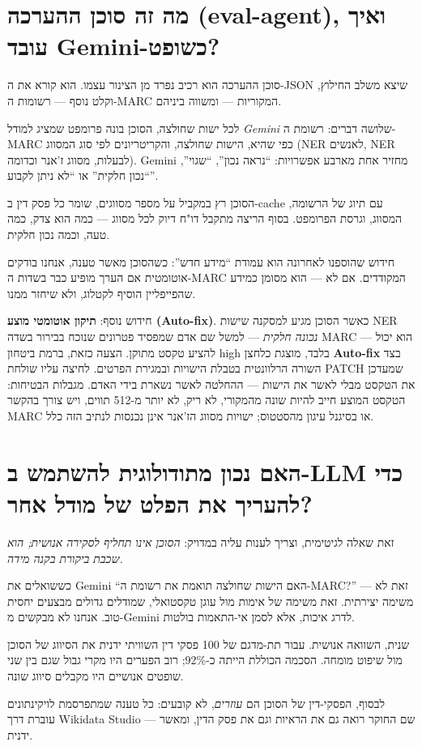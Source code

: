 \documentclass[12pt,a4paper]{article}
\begin{document}
\section{\texthebrew{מה זה סוכן ההערכה (eval-agent), ואיך עובד Gemini-כשופט?}}
\begin{hebrew}
סוכן ההערכה הוא רכיב נפרד מן הצינור עצמו. הוא קורא את ה-JSON שיצא משלב החילוץ, וקלט נוסף --- רשומות ה-MARC המקוריות --- ומשווה ביניהם.
\par
לכל ישות שחולצה, הסוכן בונה פרומפט שמציג למודל \emph{Gemini} שלושה דברים: רשומת ה-MARC כפי שהיא, הישות שחולצה, והקריטריונים לפי סוג המסווג (NER לאנשים, NER לבעלות, מסווג ז'אנר וכדומה). Gemini מחזיר אחת מארבע אפשרויות: ``נראה נכון'', ``שגוי'', ``נכון חלקית'' או ``לא ניתן לקבוע''.
\par
הסוכן רץ במקביל על מספר מסווגים, שומר כל פסק דין ב-cache עם תיוג של הרשומה, המסווג, וגרסת הפרומפט. בסוף הריצה מתקבל דו"ח דיוק לכל מסווג --- כמה הוא צדק, כמה טעה, וכמה נכון חלקית.
\par
חידוש שהוספנו לאחרונה הוא עמודת ``מידע חדש'': כשהסוכן מאשר טענה, אנחנו בודקים אוטומטית אם הערך מופיע כבר בשדות ה-MARC המקודדים. אם לא --- הוא מסומן כמידע שהפייפליין הוסיף לקטלוג, ולא שיחזר ממנו.
\par
חידוש נוסף: \textbf{תיקון אוטומטי מוצע (Auto-fix)}. כאשר הסוכן מגיע למסקנה שישות NER \emph{נכונה חלקית} --- למשל שם אדם שמפסיד פטרונים שנוכח בבירור בשדה MARC --- הוא יכול להציע טקסט מתוקן. הצעה כזאת, ברמת ביטחון \textenglish{high} בלבד, מוצגת כלחצן \textbf{Auto-fix} בצד השורה הרלוונטית בטבלת הישויות ובמגירת הפרטים. לחיצה עליו שולחת PATCH שמעדכן את הטקסט מבלי לאשר את הישות --- ההחלטה לאשר נשארת בידי האדם. מגבלות הבטיחות: הטקסט המוצע חייב להיות שונה מהמקורי, לא ריק, לא יותר מ-512 תווים, ויש צורך בהקשר MARC או בסיגנל עיגון מהסטטוס; ישויות מסווג הז'אנר אינן נכנסות לנתיב הזה כלל.
\end{hebrew}


\section{\texthebrew{האם נכון מתודולוגית להשתמש ב-LLM כדי להעריך את הפלט של מודל אחר?}}
\begin{hebrew}
זאת שאלה לגיטימית, וצריך לענות עליה במדויק: \emph{הסוכן אינו תחליף לסקירה אנושית; הוא שכבת ביקורת בקנה מידה.}
\par
כששואלים את Gemini ``האם הישות שחולצה תואמת את רשומת ה-MARC?'' --- זאת לא משימה יצירתית. זאת משימה של אימות מול עוגן טקסטואלי, שמודלים גדולים מבצעים יחסית טוב. אנחנו לא מבקשים מ-Gemini לדרג איכות, אלא לסמן אי-התאמות בולטות.
\par
שנית, השוואה אנושית. עבור תת-מדגם של 100 פסקי דין השוויתי ידנית את הסיווג של הסוכן מול שיפוט מומחה. הסכמה הכוללת הייתה כ-92\%; רוב הפערים היו מקרי גבול שגם בין שני שופטים אנושיים היו מקבלים סיווג שונה.
\par
לבסוף, הפסקי-דין של הסוכן הם \emph{עוזרים}, לא קובעים: כל טענה שמתפרסמת לויקינתונים עוברת דרך Wikidata Studio --- שם החוקר רואה גם את הראיות וגם את פסק הדין, ומאשר ידנית.
\end{hebrew}
\end{document}
